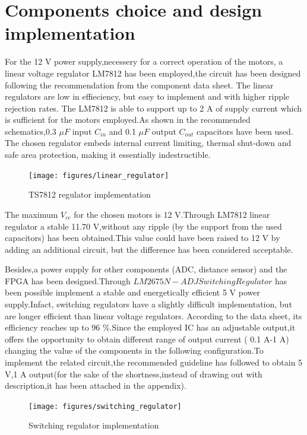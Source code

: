 \section{Components choice and design implementation}

For the 12 V power supply,necessery for a correct operation of the motors, a linear voltage regulator LM7812 \cite{linear_regulator} has been employed,the circuit has been designed following the recommendation from the component data sheet. The linear regulators are low in effieciency, but easy to implement and with higher ripple rejection rates. The LM7812 is able to support up to 2 A of supply current which is sufficient for the motors employed.As shown in the recommended schematics,0.3 $\mu F$ input $C_{in}$ and 0.1  $\mu F$ output $C_{out}$ capacitors have been used. The chosen regulator embeds internal current limiting, thermal shut-down and safe area protection, making it essentially indestructible.

\begin{figure}[!ht]
	\centering
	\texttt{[image: figures/linear\_regulator]}
	\caption{TS7812 regulator implementation}
	\label{fig:linear_reg}
\end{figure}
 
The maximum $V_{cc}$ for the chosen motors is 12 V.Through LM7812 linear regulator a stable 11.70 V,without any ripple (by the support from the used capacitors) has been obtained.This value could  have been raised to 12 V by adding an additional circuit, but the difference has been considered acceptable. 
 
Besides,a power supply for other components (ADC, distance sensor) and the FPGA has been designed.Through $LM2675N-ADJ Switching Regulator$ \cite{switching_regulator} has been possible implement a stable and energetically efficient 5 V power supply.Infact, switching regulators have a slightly difficult implementation, but are longer efficient than linear voltage regulators. According to the data sheet, its efficiency reaches up to 96 \%.Since the employed IC has an adjustable output,it offers the opportunity to obtain different range of output current ( 0.1 A-1 A) changing the value of the components in the following configuration.To implement the related circuit,the recommended guideline has followed to obtain 5 V,1 A output(for the sake of the shortness,instead of drawing out with description,it has been attached in the appendix).

\begin{figure}[!ht]
	\centering
	\texttt{[image: figures/switching\_regulator]}
	\caption{Switching regulator implementation}
	\label{fig:linear_reg}
\end{figure}

